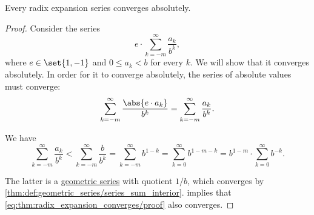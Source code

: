 \begin{proposition}\label{thm:radix_expansion_converges}
  Every radix expansion series converges absolutely.
\end{proposition}
\begin{proof}
  Consider the series
  \begin{equation}\label{eq:thm:radix_expansion_converges/proof}
    e \cdot \sum_{k=-m}^\infty \frac {a_k} {b^k},
  \end{equation}
  where \( e \in \set{ 1, -1 } \) and \( 0 \leq a_k < b \) for every \( k \). We will show that it converges absolutely. In order for it to converge absolutely, the series of absolute values must converge:
  \begin{equation}\label{eq:thm:radix_expansion_converges/absolute}
    \sum_{k=-m}^\infty \frac {\abs{e \cdot a_k}} {b^k} = \sum_{k=-m}^\infty \frac {a_k} {b^k}.
  \end{equation}

  We have
  \begin{equation*}
    \sum_{k=-m}^\infty \frac {a_k} {b^k}
    <
    \sum_{k=-m}^\infty \frac b {b^k}
    =
    \sum_{k=-m}^\infty b^{1-k}
    =
    \sum_{k=0}^\infty b^{1-m-k}
    =
    b^{1-m} \cdot \sum_{k=0}^\infty b^{-k}.
  \end{equation*}

  The latter is a \hyperref[def:geometric_series]{geometric series} with quotient \( 1 / b \), which converges by \cref{thm:def:geometric_series/series_sum_interior}.  implies that \eqref{eq:thm:radix_expansion_converges/proof} also converges.
\end{proof}

